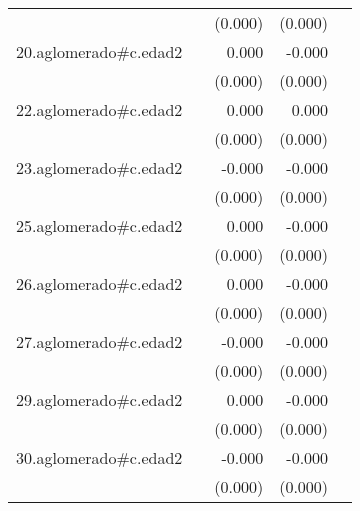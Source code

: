 {\begin{longtable}{l*{4}{D{.}{.}{-1}}}
            &                     &     (0.000)         &     (0.000)         &                     \\
\addlinespace
20.aglomerado#c.edad2&                     &       0.000         &      -0.000         &                     \\
            &                     &     (0.000)         &     (0.000)         &                     \\
\addlinespace
22.aglomerado#c.edad2&                     &       0.000         &       0.000         &                     \\
            &                     &     (0.000)         &     (0.000)         &                     \\
\addlinespace
23.aglomerado#c.edad2&                     &      -0.000         &      -0.000\sym{**} &                     \\
            &                     &     (0.000)         &     (0.000)         &                     \\
\addlinespace
25.aglomerado#c.edad2&                     &       0.000         &      -0.000         &                     \\
            &                     &     (0.000)         &     (0.000)         &                     \\
\addlinespace
26.aglomerado#c.edad2&                     &       0.000         &      -0.000         &                     \\
            &                     &     (0.000)         &     (0.000)         &                     \\
\addlinespace
27.aglomerado#c.edad2&                     &      -0.000         &      -0.000\sym{**} &                     \\
            &                     &     (0.000)         &     (0.000)         &                     \\
\addlinespace
29.aglomerado#c.edad2&                     &       0.000         &      -0.000         &                     \\
            &                     &     (0.000)         &     (0.000)         &                     \\
\addlinespace
30.aglomerado#c.edad2&                     &      -0.000         &      -0.000\sym{**} &                     \\
            &                     &     (0.000)         &     (0.000)         &                     \\

\end{longtable}}
